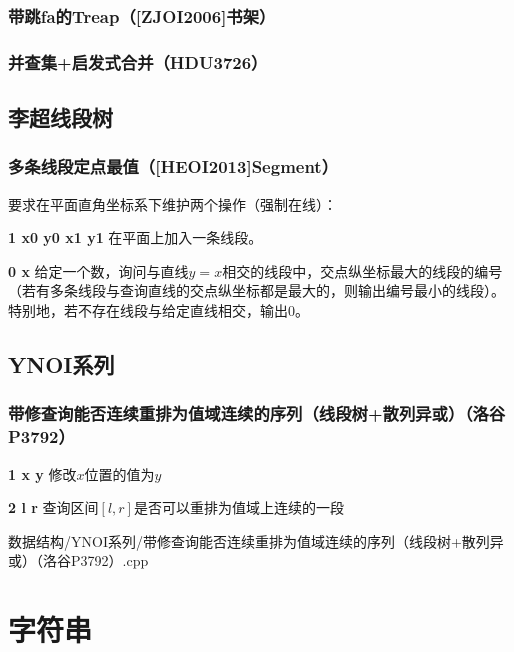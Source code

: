 \documentclass[landscape,twocolumn,a4paper]{article}
\begin{document}
\subsubsection{带跳fa的Treap（[ZJOI2006]书架）}

\subsubsection{并查集+启发式合并（HDU3726）}


\subsection{李超线段树}
\subsubsection{多条线段定点最值（[HEOI2013]Segment）}
要求在平面直角坐标系下维护两个操作（强制在线）：\par
\textbf{1 x0 y0 x1 y1} 在平面上加入一条线段。\par
\textbf{0 x} 给定一个数，询问与直线$y=x$相交的线段中，交点纵坐标最大的线段的编号（若有多条线段与查询直线的交点纵坐标都是最大的，则输出编号最小的线段）。特别地，若不存在线段与给定直线相交，输出0。


\subsection{YNOI系列}
\subsubsection{带修查询能否连续重排为值域连续的序列（线段树+散列异或）（洛谷P3792）}
\textbf{1 x y} 修改$x$位置的值为$y$\par
\textbf{2 l r} 查询区间$[l,r]$是否可以重排为值域上连续的一段\par
 {数据结构/YNOI系列/带修查询能否连续重排为值域连续的序列（线段树+散列异或）（洛谷P3792）.cpp}


\section{字符串}
\end{document}
